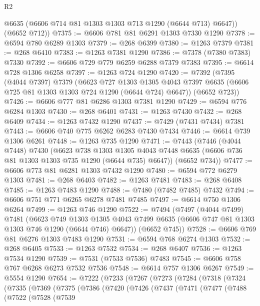 \begin{lexlean}{R2}
\begin{coremodule}
        @6635
        (@6606 @714 @81 @1303 @1303 @713 @1290 (@6644 @713) @6647))
      (@6652 @712))
@7375 := @6606 @781 @81 @6291 @1303 @7330 @1290
@7378 := @6594 @780 @6289 @1303
@7379 := @268 @6399
@7380 := @1263 @7379
@7381 := @268 @6410
@7383 := @1263 @7381 @1290
@7386 := @7378 (@7380 @7383) @7330
@7392 := @6606 @729 @779 @6259 @6288 @7379 @7383
@7395 := @6614 @728 @1306 @6258
@7397 := @1263 @724 @1290
@7420 := @7392
    (@7395
      (@4044 @7397)
      @7379
      (@6623
        @727
        @1303
        @1305
        @4043
        @7397
        @6635
        (@6606 @725 @81 @1303 @1303 @724 @1290 (@6644 @724) @6647))
      (@6652 @723))
@7426 := @6606 @777 @81 @6286 @1303 @7381 @1290
@7429 := @6594 @776 @6284 @1303
@7430 := @268 @6401
@7431 := @1263 @7430
@7432 := @268 @6409
@7434 := @1263 @7432 @1290
@7437 := @7429 (@7431 @7434) @7381
@7443 := @6606 @740 @775 @6262 @6283 @7430 @7434
@7446 := @6614 @739 @1306 @6261
@7448 := @1263 @735 @1290
@7471 := @7443
    (@7446
      (@4044 @7448)
      @7430
      (@6623
        @738
        @1303
        @1305
        @4043
        @7448
        @6635
        (@6606 @736 @81 @1303 @1303 @735 @1290 (@6644 @735) @6647))
      (@6652 @734))
@7477 := @6606 @773 @81 @6281 @1303 @7432 @1290
@7480 := @6594 @772 @6279 @1303
@7481 := @268 @6403
@7482 := @1263 @7481
@7483 := @268 @6408
@7485 := @1263 @7483 @1290
@7488 := @7480 (@7482 @7485) @7432
@7494 := @6606 @751 @771 @6265 @6278 @7481 @7485
@7497 := @6614 @750 @1306 @6264
@7499 := @1263 @746 @1290
@7522 := @7494
    (@7497
      (@4044 @7499)
      @7481
      (@6623
        @749
        @1303
        @1305
        @4043
        @7499
        @6635
        (@6606 @747 @81 @1303 @1303 @746 @1290 (@6644 @746) @6647))
      (@6652 @745))
@7528 := @6606 @769 @81 @6276 @1303 @7483 @1290
@7531 := @6594 @768 @6274 @1303
@7532 := @268 @6405
@7533 := @1263 @7532
@7534 := @268 @6407
@7536 := @1263 @7534 @1290
@7539 := @7531 (@7533 @7536) @7483
@7545 := @6606 @758 @767 @6268 @6273 @7532 @7536
@7548 := @6614 @757 @1306 @6267
@7549 := @5554 @1290
@7654 := @7222
    (@7233
      (@7267
        (@7273
          (@7284
            (@7318
              (@7324
                (@7335
                  (@7369
                    (@7375
                      (@7386
                        (@7420
                          (@7426
                            (@7437
                              (@7471
                                (@7477
                                  (@7488
                                    (@7522
                                      (@7528
                                        (@7539

\end{coremodule}
\end{lexlean}
